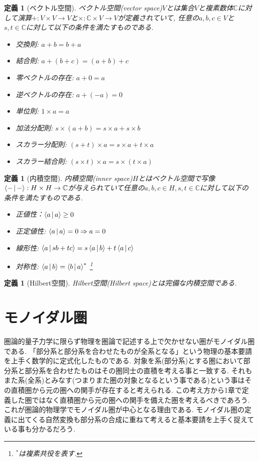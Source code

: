 \documentclass[a4paper,12pt]{ltjsarticle}
\theoremstyle{break}
\newtheorem{defn}[thm]{定義}
\newcommand{\mbc}{\mathbb{C}}
\newcommand{\ra}{\Rightarrow}
\newcommand{\ti}{\times}
\numberwithin{equation}{section}
\begin{document}
\begin{defn}[ベクトル空間]
  ベクトル空間(vector space)$V$とは集合$V$と複素数体$\mbc$に対して演算$+: V \ti V \to V$と$\ti: \mbc \ti V \to V$が定義されていて, 任意の$a, b, c \in V$と$s,t \in \mbc$に対して以下の条件を満たすものである. 
  \begin{itemize}
    \item 交換則: $a + b = b + a$
    \item 結合則: $a + (b + c) = (a + b) + c$
    \item 零ベクトルの存在: $a + 0 = a$
    \item 逆ベクトルの存在: $a + (-a) = 0$
    \item 単位則: $1 \ti a = a$
    \item 加法分配則: $s \ti (a + b) = s \ti a + s \ti b$
    \item スカラー分配則: $(s + t) \ti a = s \ti a + t \ti a$
   \item スカラー結合則:  $(s \ti t) \ti a = s \ti (t \ti a)$
  \end{itemize}
\end{defn}

\begin{defn}[内積空間]
  内積空間(inner space)$H$とはベクトル空間で写像$\Braket{-|-}: H \ti H \to \mbc$が与えられていて任意の$a,b,c \in H, s,t \in \mbc$に対して以下の条件を満たすものである. 
  \begin{itemize}
    \item 正値性：$\Braket{a|a} \geq 0$
    \item 正定値性: $\Braket{a|a}=0 \ra a=0$
    \item 線形性: $\Braket{a|sb+tc} = s\Braket{a|b}+t\Braket{a|c}$
    \item 対称性: $\Braket{a|b}=\Braket{b|a}^*$
    \footnote{
      $^*$は複素共役を表す. 
    }
  \end{itemize}
\end{defn}

\begin{defn}[Hilbert空間]
  Hilbert空間(Hilbert space)とは完備な内積空間である. 
\end{defn}  

\newpage

\section{モノイダル圏}

圏論的量子力学に限らず物理を圏論で記述する上で欠かせない圏がモノイダル圏である. 
「部分系と部分系を合わせたものが全系となる」という物理の基本要請を上手く数学的に定式化したものである. 
対象を系(部分系)とする圏において部分系と部分系を合わせたものはその圏同士の直積を考える事と一致する. 
それもまた系(全系)とみなす(つまりまた圏の対象となるという事である)という事はその直積圏から元の圏への関手が存在すると考えられる. 
この考え方から1章で定義した圏ではなく直積圏から元の圏への関手を備えた圏を考えるべきであろう. \\
これが圏論的物理学でモノイダル圏が中心となる理由である. 
モノイダル圏の定義に出てくる自然変換も部分系の合成に重ねて考えると基本要請を上手く捉えている事も分かるだろう. 
\end{document}
